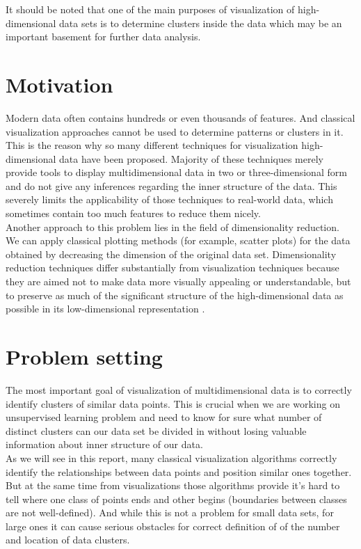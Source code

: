 It should be noted that one of the main purposes of visualization of high-dimensional data sets is to determine clusters inside the data which may be an important basement for further data analysis.


\section{Motivation}

Modern data often contains hundreds or even thousands of features. And classical visualization approaches cannot be used to determine patterns or clusters in it. This is the reason why so many different techniques for visualization high-dimensional data have been proposed. Majority of these techniques merely provide tools to display multidimensional data in two or three-dimensional form and do not give any inferences regarding the inner structure of the data. This severely limits the applicability of those techniques to real-world data, which sometimes contain too much features to reduce them nicely.\\

Another approach to this problem lies in the field of dimensionality reduction. We can apply classical plotting methods (for example, scatter plots) for the data obtained by decreasing the dimension of the original data set. Dimensionality reduction techniques differ substantially from visualization techniques because they are aimed not to make data more visually appealing or understandable, but to preserve as much of the significant structure of the high-dimensional data as possible in its low-dimensional representation \cite{tsnearticle}.

\section{Problem setting}

The most important goal of visualization of multidimensional data is to correctly identify clusters of similar data points. This is crucial when we are working on unsupervised learning problem and need to know for sure what number of distinct clusters can our data set be divided in without losing valuable information about inner structure of our data.\\

 As we will see in this report, many classical visualization algorithms correctly identify the relationships between data points and position similar ones together. But at the same time from visualizations those algorithms provide it's hard to tell where one class of points ends and other begins (boundaries between classes are not well-defined). And while this is not a problem for small data sets, for large ones it can cause serious obstacles for correct definition of of the number and location of data clusters. \\

